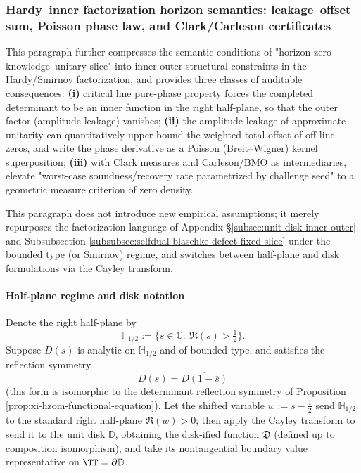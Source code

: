 \subsubsection{Hardy--inner factorization horizon semantics: leakage--offset sum, Poisson phase law, and Clark/Carleson certificates}\label{subsubsec:xi-hardy-inner-clark-carleson}
This paragraph further compresses the semantic conditions of "horizon zero-knowledge--unitary slice" into inner-outer structural constraints in the Hardy/Smirnov factorization, and provides three classes of auditable consequences:
\textbf{(i)} critical line pure-phase property forces the completed determinant to be an inner function in the right half-plane, so that the outer factor (amplitude leakage) vanishes;
\textbf{(ii)} the amplitude leakage of approximate unitarity can quantitatively upper-bound the weighted total offset of off-line zeros, and write the phase derivative as a Poisson (Breit--Wigner) kernel superposition;
\textbf{(iii)} with Clark measures and Carleson/BMO as intermediaries, elevate "worst-case soundness/recovery rate parametrized by challenge seed" to a geometric measure criterion of zero density.
\par
This paragraph does not introduce new empirical assumptions; it merely repurposes the factorization language of Appendix \S\ref{subsec:unit-disk-inner-outer} and Subsubsection \ref{subsubsec:selfdual-blaschke-defect-fixed-slice} under the bounded type (or Smirnov) regime, and switches between half-plane and disk formulations via the Cayley transform.

\paragraph{Half-plane regime and disk notation}
Denote the right half-plane by
\[
\mathbb{H}_{1/2}:=\{s\in\mathbb{C}:\ \Re(s)>\tfrac12\}.
\]
Suppose \(D(s)\) is analytic on \(\mathbb{H}_{1/2}\) and of bounded type, and satisfies the reflection symmetry
\begin{equation}\label{eq:xi-inner-reflection-symmetry}
\boxed{\;D(s)=\overline{D(1-\overline{s})}\;}
\end{equation}
(this form is isomorphic to the determinant reflection symmetry of Proposition \ref{prop:xi-hzom-functional-equation}).
Let the shifted variable \(w:=s-\tfrac12\) send \(\mathbb{H}_{1/2}\) to the standard right half-plane \(\Re(w)>0\);
then apply the Cayley transform to send it to the unit disk \(\mathbb{D}\), obtaining the disk-ified function \(\mathfrak{D}\) (defined up to composition isomorphism), and take its nontangential boundary value representative on \(\TT=\partial\mathbb{D}\).


